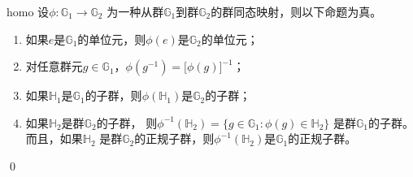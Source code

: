 	\begin{proposition}{}{homo}
		设$\phi\colon \mathbb{G}_1 \to \mathbb{G}_2$ 为一种从群$\mathbb{G}_1$到群$\mathbb{G}_2$的群同态映射，则以下命题为真。
		\begin{enumerate}
			\item 如果$e$是$\mathbb{G}_1$的单位元，则$\phi(e)$是$\mathbb{G}_2$的单位元；
			
			\item 对任意群元$g \in \mathbb{G}_1$，$\phi(g^{-1}) = \lbrack \phi(g)\rbrack^{-1}$；
			
			\item 如果$\mathbb{H}_1$是$\mathbb{G}_1$的子群，则$\phi(\mathbb{H}_1)$是$\mathbb{G}_2$的子群；
			
			\item 如果$\mathbb{H}_2$是群$\mathbb{G}_2$的子群，
			则$\phi^{-1}(\mathbb{H}_2) = \{g \in \mathbb{G}_1 : \phi(g) \in \mathbb{H}_2\}$
			是群$\mathbb{G}_1$的子群。
			而且，如果$\mathbb{H}_2$ 是群$\mathbb{G}_2$的正规子群，则$\phi^{-1}(\mathbb{H}_2)$是$\mathbb{G}_1$的正规子群。
		\end{enumerate}
		\qed
	\end{proposition}
	
